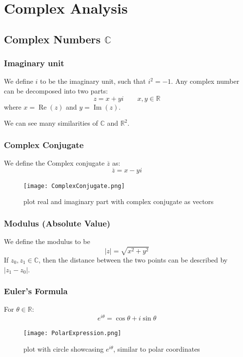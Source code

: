 \chapter{Complex Analysis}

\section{Complex Numbers $\mathbb C$}
\subsection{Imaginary unit}
We define $i$ to be the imaginary unit, such that $i^2=-1$. Any complex number can be decomposed into two parts:
$$
z=x+yi\qquad x,y\in\mathbb R
$$
where $x=\operatorname{Re}(z)$ and $y=\operatorname{Im}(z)$.

We can see many similarities of $\mathbb C$ and $\mathbb R^2$.

\subsection{Complex Conjugate}
We define the Complex conjugate $\overline z$ as: 
$$
\overline z = x-yi
$$
\begin{figure}[H]
    \begin{center}
    \texttt{[image: ComplexConjugate.png]}
    \caption{plot real and imaginary part with complex conjugate as vectors}
    \end{center}
\end{figure}

\subsection{Modulus (Absolute Value)}
We define the modulus to be
$$
\lvert z \rvert = \sqrt{x^2+y^2}
$$
If $z_0,z_1\in\mathbb C$, then the distance between the two points can be described by $\lvert z_1-z_0\rvert$.


\subsection{Euler's Formula}
For $\theta\in \mathbb R$: 
$$
e^{i\theta} = \cos\theta + i\sin\theta
$$

\begin{figure}[H]
    \begin{center}
    \texttt{[image: PolarExpression.png]}
    \caption{plot with circle showcasing $e^{i\theta}$, similar to polar coordinates}
    \end{center}
\end{figure}

